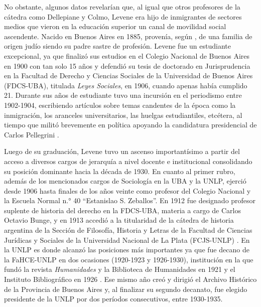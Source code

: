 No obstante, algunos datos revelarían que, al igual que otros profesores de la cátedra como Dellepiane y Colmo, Levene era hijo de inmigrantes de sectores medios que vieron en la educación superior un canal de movilidad social ascendente. Nacido en Buenos Aires en 1885, provenía, según \textcite{1628-GALVEZ2002}, de una familia de origen judío siendo su padre sastre de profesión. Levene fue un estudiante excepcional, ya que finalizó sus estudios en el Colegio Nacional de Buenos Aires en 1900 con tan solo 15 años \parencite{1530-RAJMANOVICH2016} y defendió su tesis de doctorado en Jurisprudencia en la Facultad de Derecho y Ciencias Sociales de la Universidad de Buenos Aires (FDCS-UBA), titulada \emph{Leyes Sociales}, en 1906, cuando apenas había cumplido 21. Durante sus años de estudiante tuvo una incursión en el periodismo entre 1902-1904, escribiendo artículos sobre temas candentes de la época como la inmigración, los aranceles universitarios, las huelgas estudiantiles, etcétera, al tiempo que militó brevemente en política apoyando la candidatura presidencial de Carlos Pellegrini \parencite{1526-RODRIGUEZ2001}.

Luego de su graduación, Levene tuvo un ascenso importantísimo a partir del acceso a diversos cargos de jerarquía a nivel docente e institucional consolidando su posición dominante hacia la década de 1930. En cuanto al primer rubro, además de los mencionados cargos de Sociología en la UBA y la UNLP, ejerció desde 1906 hasta finales de los años veinte como profesor del Colegio Nacional y la Escuela Normal n.° 40 \enquote{Estanislao S. Zeballos}. En 1912 fue designado profesor suplente de historia del derecho en la FDCS-UBA, materia a cargo de Carlos Octavio Bunge, y en 1913 accedió a la titularidad de la cátedra de historia argentina de la Sección de Filosofía, Historia y Letras de la Facultad de Ciencias Jurídicas y Sociales de la Universidad Nacional de La Plata (FCJS-UNLP) \parencite{1627-FINOCCHIO2001}. En la UNLP es donde alcanzó las posiciones más importantes ya que fue decano de la FaHCE-UNLP en dos ocasiones (1920-1923 y 1926-1930), institución en la que fundó la revista \emph{Humanidades} y la Biblioteca de Humanidades en 1921 y el Instituto Bibliográfico en 1926 \parencite{1686-HERAS1959}. Ese mismo año creó y dirigió el Archivo Histórico de la Provincia de Buenos Aires y, al finalizar su segundo decanato, fue elegido presidente de la UNLP por dos períodos consecutivos, entre 1930-1935.

